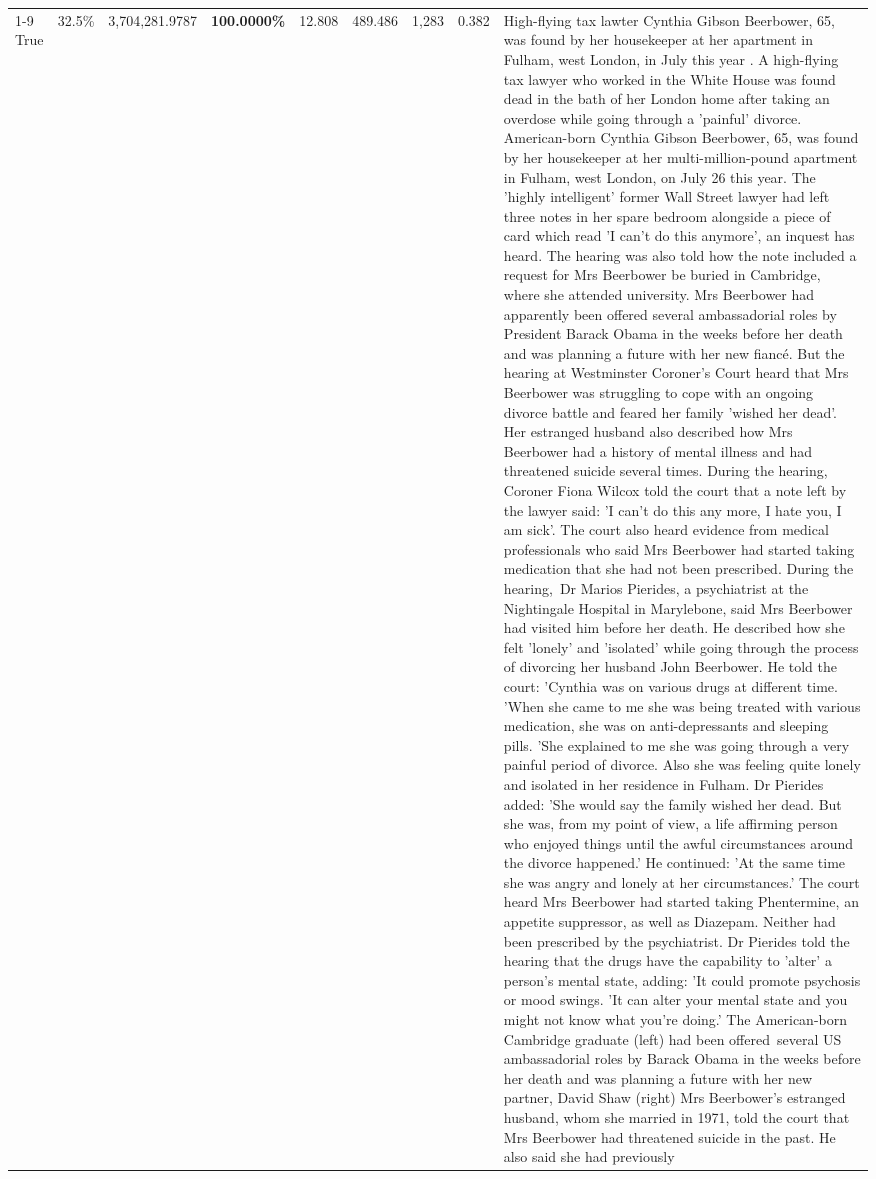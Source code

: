 \begin{table}[H]
\begin{tabular}{lllrlllll}
\cline{1-9}
True & 32.5\% & 3,704,281.9787 & \bfseries \color{red} 100.0000\% & 12.808 & 489.486 & 1,283 & 0.382 & High-flying tax lawter Cynthia Gibson Beerbower, 65, was found by her housekeeper at her apartment in Fulham, west London, in July this year . A high-flying tax lawyer who worked in the White House was found dead in the bath of her London home after taking an overdose while going through a 'painful' divorce. American-born Cynthia Gibson Beerbower, 65, was found by her housekeeper at her multi-million-pound apartment in Fulham, west London, on July 26 this year. The 'highly intelligent' former Wall Street lawyer had left three notes in her spare bedroom alongside a piece of card which read 'I can't do this anymore', an inquest has heard. The hearing was also told how the note included a request for Mrs Beerbower be buried in Cambridge, where she attended university. Mrs Beerbower had apparently been offered several ambassadorial roles by President Barack Obama in the weeks before her death and was planning a future with her new fiancé. But the hearing at Westminster Coroner's Court heard that Mrs Beerbower was struggling to cope with an ongoing divorce battle and feared her family 'wished her dead'. Her estranged husband also described how Mrs Beerbower had a history of mental illness and had threatened suicide several times. During the hearing, Coroner Fiona Wilcox told the court that a note left by the lawyer said: 'I can't do this any more, I hate you, I am sick'. The court also heard evidence from medical professionals who said Mrs Beerbower had started taking medication that she had not been prescribed. During the hearing, Dr Marios Pierides, a psychiatrist at the Nightingale Hospital in Marylebone, said Mrs Beerbower had visited him before her death. He described how she felt 'lonely' and 'isolated' while going through the process of divorcing her husband John Beerbower. He told the court: 'Cynthia was on various drugs at different time. 'When she came to me she was being treated with various medication, she was on anti-depressants and sleeping pills. 'She explained to me she was going through a very painful period of divorce. Also she was feeling quite lonely and isolated in her residence in Fulham. Dr Pierides added: 'She would say the family wished her dead. But she was, from my point of view, a life affirming person who enjoyed things until the awful circumstances around the divorce happened.' He continued: 'At the same time she was angry and lonely at her circumstances.' The court heard Mrs Beerbower had started taking Phentermine, an appetite suppressor, as well as Diazepam. Neither had been prescribed by the psychiatrist. Dr Pierides told the hearing that the drugs have the capability to 'alter' a person's mental state, adding: 'It could promote psychosis or mood swings. 'It can alter your mental state and you might not know what you're doing.' The American-born Cambridge graduate (left) had been offered several US ambassadorial roles by Barack Obama in the weeks before her death and was planning a future with her new partner, David Shaw (right) Mrs Beerbower's estranged husband, whom she married in 1971, told the court that Mrs Beerbower had threatened suicide in the past. He also said she had previously 
\end{tabular}
\end{table}
